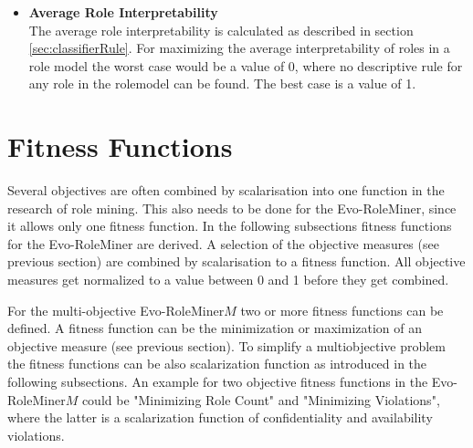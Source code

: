     \begin{itemize}
    	\item \textbf{Average Role Interpretability}\\
    	The average role interpretability is calculated as described in section \ref{sec:classifierRule}.
    	For maximizing the average interpretability of roles in a role model the worst case would be a value of 0, where no descriptive rule for any role in the rolemodel can be found. The best case is a value of 1.
    \end{itemize}
        
    \section{Fitness Functions}        
    Several objectives are often combined by scalarisation into one function in the research of role mining. This also needs to be done for the Evo-RoleMiner, since it allows only one fitness function. In the following subsections fitness functions for the Evo-RoleMiner are derived. A selection of the objective measures (see previous section) are combined by scalarisation to a fitness function. All objective measures get normalized to a value between 0 and 1 before they get combined.
    
    For the multi-objective Evo-RoleMiner$M$ two or more fitness functions can be defined. A fitness function can be the minimization or maximization of an objective measure (see previous section). To simplify a multiobjective problem the fitness functions can be also scalarization function as introduced in the following subsections. An example for two objective fitness functions in the Evo-RoleMiner$M$ could be "Minimizing Role Count" and "Minimizing Violations", where the latter is a scalarization function of confidentiality and availability violations.
        
